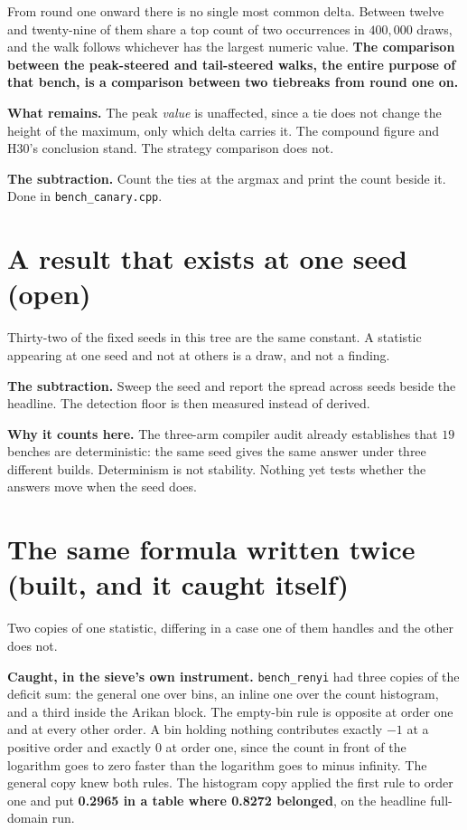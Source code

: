 From round one onward there is no single most common delta. Between twelve and twenty-nine of them share a top count of two occurrences in \(400{,}000\) draws, and the walk follows whichever has the largest numeric value. \textbf{The comparison between the peak-steered and tail-steered walks, the entire purpose of that bench, is a comparison between two tiebreaks from round one on.}

\textbf{What remains.} The peak \emph{value} is unaffected, since a tie does not change the height of the maximum, only which delta carries it. The compound figure and H30's conclusion stand. The strategy comparison does not.

\textbf{The subtraction.} Count the ties at the argmax and print the count beside it. Done in \texttt{bench\_canary.cpp}.

\section{A result that exists at one seed (open)}

Thirty-two of the fixed seeds in this tree are the same constant. A statistic appearing at one seed and not at others is a draw, and not a finding.

\textbf{The subtraction.} Sweep the seed and report the spread across seeds beside the headline. The detection floor is then measured instead of derived.

\textbf{Why it counts here.} The three-arm compiler audit already establishes that \(19\) benches are deterministic: the same seed gives the same answer under three different builds. Determinism is not stability. Nothing yet tests whether the answers move when the seed does.

\section{The same formula written twice (built, and it caught itself)}

Two copies of one statistic, differing in a case one of them handles and the other does not.

\textbf{Caught, in the sieve's own instrument.} \texttt{bench\_renyi} had three copies of the deficit sum: the general one over bins, an inline one over the count histogram, and a third inside the Arikan block. The empty-bin rule is opposite at order one and at every other order. A bin holding nothing contributes exactly \(-1\) at a positive order and exactly \(0\) at order one, since the count in front of the logarithm goes to zero faster than the logarithm goes to minus infinity. The general copy knew both rules. The histogram copy applied the first rule to order one and put \textbf{0.2965 in a table where 0.8272 belonged}, on the headline full-domain run.

